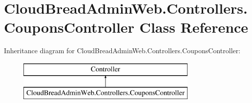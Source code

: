 \hypertarget{a00071}{}\section{Cloud\+Bread\+Admin\+Web.\+Controllers.\+Coupons\+Controller Class Reference}
\label{a00071}
Inheritance diagram for Cloud\+Bread\+Admin\+Web.\+Controllers.\+Coupons\+Controller\+:\begin{figure}[H]
\begin{center}
\leavevmode
\includegraphics[height=2.000000cm]{a00071}
\end{center}
\end{figure}

